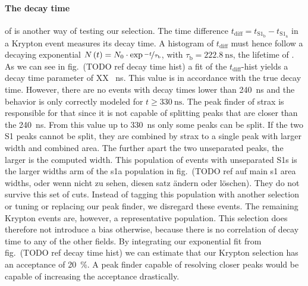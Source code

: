 \paragraph{The decay time} of  is another way of testing our selection.
The time difference $ t_\mathrm{diff} = t_{\mathrm{S}1_\mathrm{b}} - t_{\mathrm{S}1_\mathrm{a}} $ in a Krypton event measures its decay time.
A histogram of $ t_\mathrm{diff} $ must hence follow a decaying exponential $ N \left( t \right) = N_0 \cdot \exp{\nicefrac{-t}{\tau_\mathrm{b}}} $, with $ \tau_\mathrm{b} = \SI{222.8}{\nano\s} $, the lifetime of .
As we can see in fig.~(TODO ref decay time hist) a fit of the $ t_\mathrm{diff} $-hist yields a decay time parameter of XX \SI{}{\nano\s}. %
This value is in accordance with the true decay time. %
However, there are no events with decay times lower than \SI{240}{\nano\s} and the behavior is only correctly modeled for $ t \ge \SI{330}{\nano\s} $.
The peak finder of strax is responsible for that since it is not capable of splitting peaks that are closer than the \SI{240}{\nano\s}.
From this value up to \SI{330}{\nano\s} only some peaks can be split.
If the two S1 peaks cannot be split, they are combined by strax to a single peak with larger width and combined area.
The further apart the two unseparated peaks, the larger is the computed width.
This population of events with unseparated S1s is the larger widths arm of the \gls{s1a} population in fig.~(TODO ref auf main s1 area widths, oder wenn nicht zu sehen, diesen satz ändern oder löschen).
They do not survive this set of cuts.
Instead of tagging this population with another selection or tuning or replacing our peak finder, we disregard these events.
The remaining Krypton events are, however, a representative population.
This selection does therefore not introduce a bias otherwise, because there is no correlation of decay time to any of the other fields.
By integrating our exponential fit from fig.~(TODO ref decay time hist) we can estimate that our Krypton selection has an acceptance of \SI{20}{\%}.
A peak finder capable of resolving closer peaks would be capable of increasing the acceptance drastically.



\FloatBarrier

